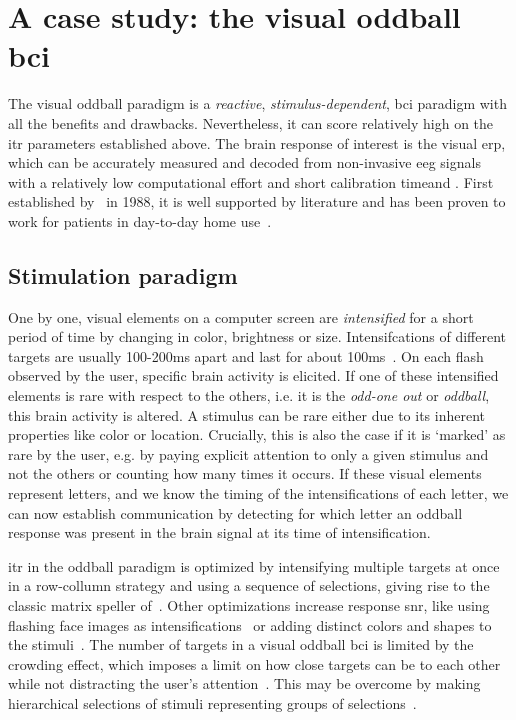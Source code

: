 \section{A case study: the visual oddball \acs{bci}}

The visual oddball paradigm is a \emph{reactive}, \emph{stimulus-dependent},
\ac{bci} paradigm with all the benefits and drawbacks.
Nevertheless, it can score relatively high on the \ac{itr} parameters established above.
The brain response of interest is the visual \ac{erp}, which can be accurately
measured and decoded from non-invasive \ac{eeg} signals with a relatively low
computational effort and short calibration timeand .
First established by~\cite{Farwell1988} in 1988, it is well supported by literature
and has been proven to work for patients in day-to-day home
use~\cite{Wolpaw2018}.

\subsection{Stimulation paradigm}
One by one, visual elements on a computer screen are \emph{intensified} for a
short period of time by changing in color, brightness or size.
Intensifcations of different targets are usually 100-200ms apart and last for about
100ms~\cite{Sellers2006a}.
On each flash observed by the user, specific brain activity is elicited.
If one of these intensified elements is rare with respect to the others, i.e. it is the
\emph{odd-one out} or \emph{oddball}, this brain activity is altered.
A stimulus can be rare either due to its inherent properties like color or
location.
Crucially, this is also the case if it is `marked' as rare by the user, e.g.
by paying explicit attention to only a given stimulus and not the others or
counting how many times it occurs.
If these visual elements represent letters, and we know the timing of the
intensifications of each letter, we can now establish communication by detecting
for which letter an oddball response was present in the brain signal at its
time of intensification.

\Ac{itr} in the oddball paradigm is optimized by intensifying
multiple targets at once in a row-collumn strategy and using a sequence of
selections, giving rise to the classic matrix speller of~\cite{Farwell1988}.
Other optimizations increase response \ac{snr}, like using flashing face
images as intensifications~\cite{Jin2012} or adding distinct colors and shapes to the
stimuli~\cite{Treder2011}.
The number of targets in a visual oddball \ac{bci} is limited by the crowding
effect, which imposes a limit on how close targets can be to each other while
not distracting the user's attention~\cite{Sellers2006a,Li2010}.
This may be overcome by making hierarchical selections of stimuli representing
groups of selections~\cite{Treder2010}.

